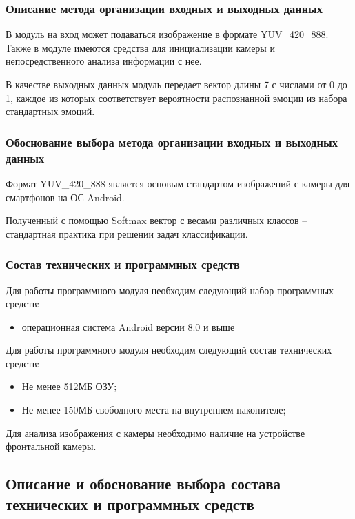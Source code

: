 \documentclass[a4paper,12pt]{article}
\begin{document}
    \subsubsection{Описание метода организации входных и выходных данных}

    В модуль на вход может подаваться изображение в формате YUV\_420\_888.
    Также в модуле имеются средства для инициализации камеры и непосредственного анализа информации с нее.

    В качестве выходных данных модуль передает вектор длины 7 с числами от 0 до 1, каждое из которых соответствует вероятности распознанной эмоции из набора стандартных эмоций.

    \subsubsection{Обоснование выбора метода организации входных и выходных данных}

    Формат YUV\_420\_888 является основым стандартом изображений с камеры для смартфонов на ОС Android.

    Полученный с помощью Softmax вектор с весами различных классов -- стандартная практика при решении задач классификации.

    \subsubsection{Состав технических и программных средств}
    Для работы программного модуля необходим следующий набор программных средств:
    \begin{itemize}
        \item операционная система Android версии 8.0 и выше
    \end{itemize}

    Для работы программного модуля необходим следующий состав технических средств:
    \begin{itemize}
        \item Не менее 512МБ ОЗУ;
        \item Не менее 150МБ свободного места на внутреннем накопителе;
    \end{itemize}

    Для анализа изображения с камеры необходимо наличие на устройстве фронтальной камеры.

    \subsection{Описание и обоснование выбора состава технических и программных средств}
\end{document}
